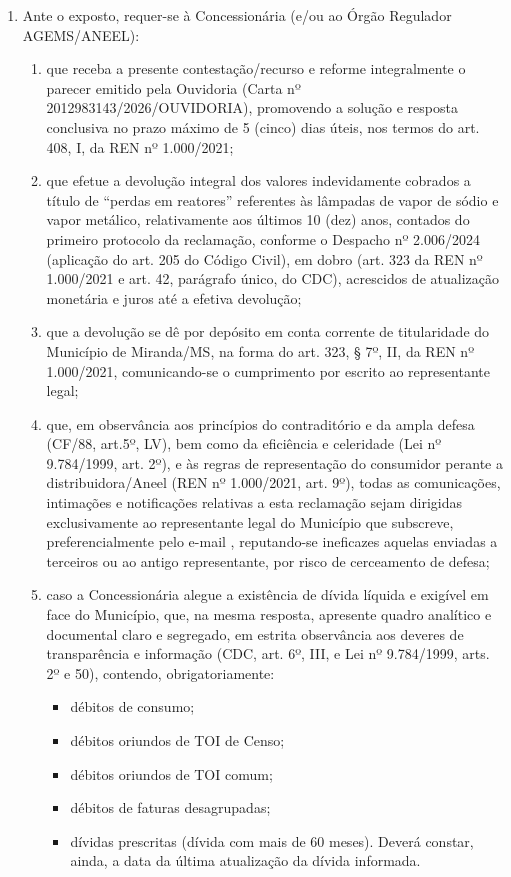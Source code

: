 \begin{enumerate}[resume]

\item
Ante o exposto, requer-se à Concessionária (e/ou ao Órgão Regulador AGEMS/ANEEL): 

\begin{enumerate}
    \item que receba a presente contestação/recurso e reforme integralmente o parecer emitido pela Ouvidoria (Carta nº 2012983143/2026/OUVIDORIA), promovendo a solução e resposta conclusiva no prazo máximo de 5 (cinco) dias úteis, nos termos do art. 408, I, da REN nº 1.000/2021;
    \item que efetue a devolução integral dos valores indevidamente cobrados a título de “perdas em reatores” referentes às lâmpadas de vapor de sódio e vapor metálico, relativamente aos últimos 10 (dez) anos, contados do primeiro protocolo da reclamação, conforme o Despacho nº 2.006/2024 (aplicação do art. 205 do Código Civil), em dobro (art. 323 da REN nº 1.000/2021 e art. 42, parágrafo único, do CDC), acrescidos de atualização monetária e juros até a efetiva devolução; 
    \item que a devolução se dê por depósito em conta corrente de titularidade do Município de Miranda/MS, na forma do art. 323, § 7º, II, da REN nº 1.000/2021, comunicando-se o cumprimento por escrito ao representante legal; 
    \item que, em observância aos princípios do contraditório e da ampla defesa (CF/88, art.5º, LV), bem como da eficiência e celeridade (Lei nº 9.784/1999, art. 2º), e às regras de representação do consumidor perante a distribuidora/Aneel (REN nº 1.000/2021, art. 9º), todas as comunicações, intimações e notificações relativas a esta reclamação sejam dirigidas exclusivamente ao representante legal do Município que subscreve, preferencialmente pelo e-mail \emailEmpresa{}, reputando-se ineficazes aquelas enviadas a terceiros ou ao antigo representante, por risco de cerceamento de defesa;
    \item caso a Concessionária alegue a existência de dívida líquida e exigível em face do Município, que, na mesma resposta, apresente quadro analítico e documental claro e segregado, em estrita observância aos deveres de transparência e informação (CDC, art. 6º, III, e Lei nº 9.784/1999, arts. 2º e 50), contendo, obrigatoriamente: 
    \begin{itemize}
        \item débitos de consumo; 
        \item débitos oriundos de TOI de Censo;
        \item débitos oriundos de TOI comum; 
        \item débitos de faturas desagrupadas; 
        \item dívidas prescritas (dívida com mais de 60 meses). Deverá constar, ainda, a data da última atualização da dívida informada.
    \end{itemize}
\end{enumerate}

\end{enumerate}